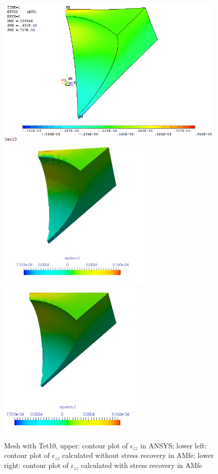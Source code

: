 \begin{figure}[htbp]
	\begin{center}
		\includegraphics[width=11cm,clip]{Tet10_Ezz.png} 
		\includegraphics[width=7.5cm,clip]{Tet10_Ezz_PD.png} 		
		\includegraphics[width=7cm,clip]{Tet10_Ezz_P.png} 		
		\caption{Mesh with Tet10, upper: contour plot of $\epsilon_{zz}$ in ANSYS; lower left: contour plot of $\epsilon_{zz}$ calculated without stress recovery in AMfe; lower right: contour plot of $\epsilon_{zz}$ calculated with stress recovery in AMfe} \label{fig: Tet10_Ezz}
	\end{center}
\end{figure}
\clearpage 


